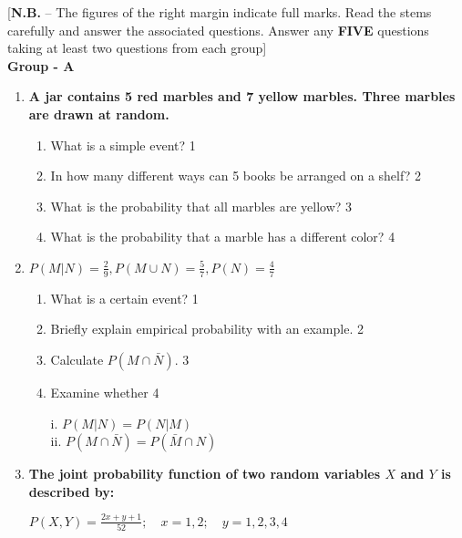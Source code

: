 \documentclass{article}
\begin{document}
\begin{center}
[\textbf{N.B.} – The figures of the right margin indicate full marks. Read the stems carefully and answer the associated questions. Answer any \textbf{FIVE} questions taking at least two questions from each group]\\

\textbf{Group  - A}



\end{center}
  \begin{enumerate}

  \item
	  \textbf{A jar contains 5 red marbles and 7 yellow marbles. 
	  Three marbles are drawn at random.} 
  
  \begin{enumerate}
  \item What is a simple event? \hfill 1
  \item In how many different ways can 5 books be arranged on a shelf? \hfill 2
    \item  
	What is the probability that all marbles are yellow? \hfill 3
    \item
	What is the probability that a marble has a different color? \hfill 4
  \end{enumerate}

\item \textbf{\( P(M \vert N) = \frac{2}{9}, P(M \cup N) = \frac{5}{7}, P(N) = \frac{4}{7} \)}

\begin{enumerate}
  \item What is a certain event? \hfill 1
  \item Briefly explain empirical probability with an example. \hfill 2
    \item Calculate \( P(M \cap \bar{N}) \). \hfill 3
    
    \item Examine whether   \hfill 4
    
    i. $P(M \vert N) = P(N \vert M)$ \\
    ii. $P(M \cap \bar N) = P(\bar M \cap N)$
    
    \end{enumerate}
    
      \item
  \textbf{The joint probability function of two random variables \( X \) and \( Y \) is described by:}
  
  \begin{center}
  \( \displaystyle P(X,Y) = \frac{2x + y + 1}{52}; \quad x = 1, 2; \quad y = 1, 2, 3, 4 \)
  \end{center}
 

\end{enumerate}
\end{document}
